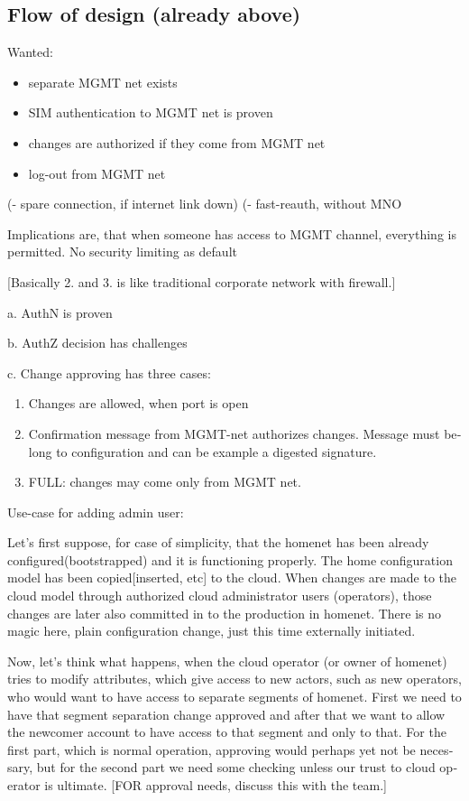 \documentclass[12pt,a4paper,english]{tutthesis}
\begin{document}
\begin{otherlanguage}{english}
\section{Flow of design (already above)}
\label{sec-4-2}

Wanted: 
\begin{itemize}
\item separate MGMT net exists
\item SIM authentication to MGMT net is proven
\item changes are authorized if they come from MGMT net
\item log-out from MGMT net
\end{itemize}
(- spare connection, if internet link down)
(- fast-reauth, without MNO

Implications are, that when someone has access to MGMT channel,
everything is permitted. No security limiting as default 

[Basically 2. and 3. is like traditional corporate network with firewall.]

a. AuthN is proven

b. AuthZ decision has challenges

c. Change approving has three cases:
\begin{enumerate}
\item Changes are allowed, when port is open
\item Confirmation message from MGMT-net authorizes changes.
Message must belong to configuration and can be example a digested signature.
\item FULL: changes may come only from MGMT net.
\end{enumerate}


Use-case for adding admin user:

Let's first suppose, for case of simplicity, that the homenet has been
already configured(bootstrapped) and it is functioning properly.  The
home configuration model has been copied[inserted, etc] to the cloud.
When changes are made to the cloud model through authorized cloud
administrator users (operators), those changes are later also committed
in to the production in homenet. There is no magic here, plain
configuration change, just this time externally initiated.

Now, let's think what happens, when the cloud operator (or owner of
homenet) tries to modify attributes, which give access to new actors,
such as new operators, who would want to have access to separate
segments of homenet.  First we need to have that segment separation
change approved and after that we want to allow the newcomer account
to have access to that segment and only to that. For the first part,
which is normal operation, approving would perhaps yet not be
necessary, but for the second part we need some checking unless our
trust to cloud operator is ultimate.  [FOR approval needs, discuss
this with the team.]





\end{otherlanguage}
\end{document}
